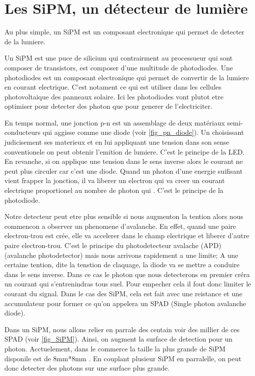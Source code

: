 \section{Les SiPM, un détecteur de lumière}
Au plus simple, un SiPM est un composant electronique qui permet de detecter de la lumiere.

Un SiPM est une puce de silicium qui contrairment au processueur qui sont composer de transistors, est composer d'une multitude de photodiodes. Une photodiodes est un composant electronique qui permet de convertir de la lumiere en courant electrique. C'est notament ce qui est utiliser dans les cellules photovoltaique des panneaux solaire. Ici les photodiodes vont plutot etre optimiser pour detecter des photon que pour generer de l'electriciter. 

En temps normal, une jonction p-n est un assemblage de deux matériaux semi-conducteurs qui aggisse comme une diode (voir \cref{fig_pn_diode}). Un choisissant judicisement ses materieux et en lui appliquant une tension dans son sense conventionele on peut obtenir l'emition de lumiere. C'est le principe de la LED. En revanche, si on applique une tension dans le sens inverse alors le courant ne peut plus circuler car c'est une diode. Quand un photon d'une energie suifisant vient frapper la jonction, il va liberer un electron qui va creer un courant electrique proportionel au nombre de photon qui . C'est le principe de la photodiode.

Notre detecteur peut etre plus sensible si nous augmenton la tention alors nous commencon a observer un phenomene d'avalanche. En effet, quand une paire electron-trou est crée, elle va accelerer dans le champ electrique et liberer d'autre paire electron-trou. C'est le principe du photodetecteur avalache (APD)
(avalanche photodetector) mais nous arrivons rapidement a une limite; A une certaine tention, dite la tenstion de claquage, la diode va se mettre a conduire dans le sens inverse. Dans ce cas le photon que nous detecterons en premier créra un courant qui s'entrenindras tous suel. Pour empecher cela il fout donc limiter le courant du signal. Dans le cas des SiPM, cela est fait avec une reistance et une accumulateur pour former ce qu'on appelera un SPAD (Single photon avalanche diode).

Dans un SiPM, nous allons relier en parrale des centain voir des millier de ces SPAD (voir \cref{fig_SiPM}). Ainsi, on augment la surface de detection pour un photon. Acctuelement, dans le commerce la taille la plus grande de SiPM disponile est de 8mm*8mm \cite{}. En couplant plusieur SiPM en parralelle, on peut donc detecter des photons sur une surface plus grande.

